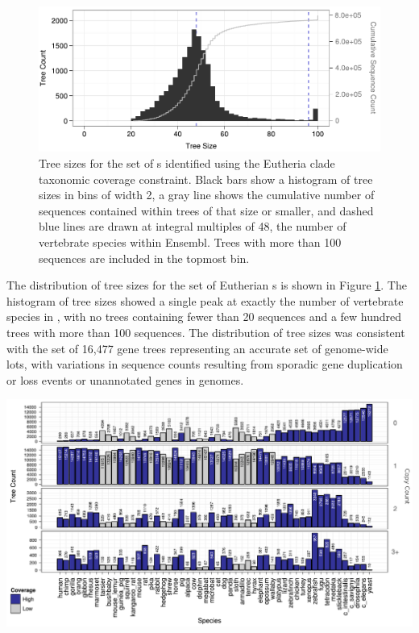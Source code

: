 \begin{figure}
\centering
\includegraphics[scale=0.9]{Figs/hist_euth_roots.pdf}
\caption{Tree sizes for the set of \subtr{}s identified using the
  Eutheria clade taxonomic coverage constraint. Black bars show a
  histogram of tree sizes in bins of width 2, a gray line shows
  the cumulative number of sequences contained within trees of that
  size or smaller, and dashed blue lines are drawn at integral
  multiples of 48, the number of vertebrate species within
  Ensembl. Trees with more than 100 sequences are included in the
  topmost bin.}
\label{fig_ensembl_euth_hist}
\end{figure}

The distribution of tree sizes for the set of Eutherian \subtr{}s is
shown in Figure \ref{fig_ensembl_euth_hist}. The histogram of tree sizes
showed a single peak at exactly the number of vertebrate species in
\ens, with no trees containing fewer than 20 sequences and a few
hundred trees with more than 100 sequences. The distribution of tree
sizes was consistent with the set of 16,477 gene trees representing an
accurate set of genome-wide \mammln \acp{lot}, with variations in
sequence counts resulting from sporadic gene duplication or loss
events or unannotated genes in \lcv genomes.

\bbfig
\centering
\includegraphics[scale=0.83]{Figs/dups_euth_roots.pdf}
\caption{Taxonomic distribution of gene copy counts for the Eutheria
  \subtr{}s defined by taxonomic coverage constraints. Results for the
  Primates, Glires, and Laurasiatheria are omitted for clarity; they
  showed similar characteristics to the Eutheria, Amniotes, and
  Vertebrata methods \ref{ensembl_subtree_table}). Each panel from top
  to bottom shows the number of trees containing 0, 1, 2 or more than
  3 sequences from each species. Bars are colored blue and gray for
  species with high- and low-coverage genomes, respectively. Note that
  the y-axis scale is not the same for each panel.}
\label{fig_ortholog_euth_dups}
\eefig

